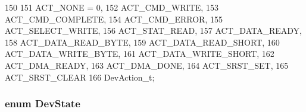 \begin{DoxyCode}
150                        {
151     ACT_NONE = 0,
152     ACT_CMD_WRITE,
153     ACT_CMD_COMPLETE,
154     ACT_CMD_ERROR,
155     ACT_SELECT_WRITE,
156     ACT_STAT_READ,
157     ACT_DATA_READY,
158     ACT_DATA_READ_BYTE,
159     ACT_DATA_READ_SHORT,
160     ACT_DATA_WRITE_BYTE,
161     ACT_DATA_WRITE_SHORT,
162     ACT_DMA_READY,
163     ACT_DMA_DONE,
164     ACT_SRST_SET,
165     ACT_SRST_CLEAR
166 } DevAction_t;
\end{DoxyCode}
\hypertarget{ide__disk_8hh_a11f4d653b474b99bf5796f4be62f72c6}{
\subsubsection[{DevState}]{\setlength{\rightskip}{0pt plus 5cm}enum {\bf DevState}}}
\label{ide__disk_8hh_a11f4d653b474b99bf5796f4be62f72c6}
